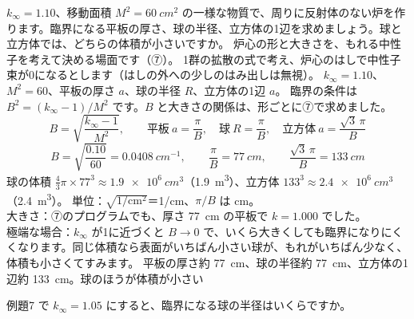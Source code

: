 \label{ph:原-15:ex7}
\begin{phreidai}[はだかの炉が臨界になる大きさ]
$k_\infty=1.10$、移動面積 $M^2=\qty{60}{cm^2}$ の一様な物質で、周りに反射体のない炉を作ります。臨界になる平板の厚さ、球の半径、立方体の1辺を求めましょう。球と立方体では、どちらの体積が小さいですか。
\phbamen
炉心の形と大きさを、もれる中性子を考えて決める場面です（⑦）。
\phmushi
1群の拡散の式で考え、炉心のはしで中性子束が0になるとします（はしの外への少しのはみ出しは無視）。
\phzu
$k_\infty=1.10$、$M^2=60$、平板の厚さ $a$、球の半径 $R$、立方体の1辺 $a$。
\phriyu
臨界の条件は $B^2=(k_\infty-1)/M^2$ です。$B$ と大きさの関係は、形ごとに⑦で求めました。
\phtateru
\[ B=\sqrt{\frac{k_\infty-1}{M^2}},\qquad \text{平板}\ a=\frac{\pi}{B},\quad \text{球}\ R=\frac{\pi}{B},\quad \text{立方体}\ a=\frac{\sqrt3\,\pi}{B} \]
\phtoku
\[ B=\sqrt{\frac{0.10}{60}}=\qty{0.0408}{cm^{-1}},\qquad \frac{\pi}{B}=\qty{77}{cm},\qquad \frac{\sqrt3\,\pi}{B}=\qty{133}{cm} \]
球の体積 $\tfrac43\pi\times77^3\approx\qty{1.9e6}{cm^3}$（\qty{1.9}{m^3}）、立方体 $133^3\approx\qty{2.4e6}{cm^3}$（\qty{2.4}{m^3}）。
\phtashikame
単位：$\sqrt{1/\mathrm{cm^2}}$＝1/cm、$\pi/B$ は cm。\\
大きさ：⑦のプログラムでも、厚さ \qty{77}{cm} の平板で $k=1.000$ でした。\\
極端な場合：$k_\infty$ が1に近づくと $B\to0$ で、いくら大きくしても臨界になりにくくなります。同じ体積なら表面がいちばん小さい球が、もれがいちばん少なく、体積も小さくてすみます。
\kotae 平板の厚さ約 \qty{77}{cm}、球の半径約 \qty{77}{cm}、立方体の1辺約 \qty{133}{cm}。球のほうが体積が小さい
\end{phreidai}
\begin{jibun}
例題7 で $k_\infty=1.05$ にすると、臨界になる球の半径はいくらですか。
\end{jibun}

